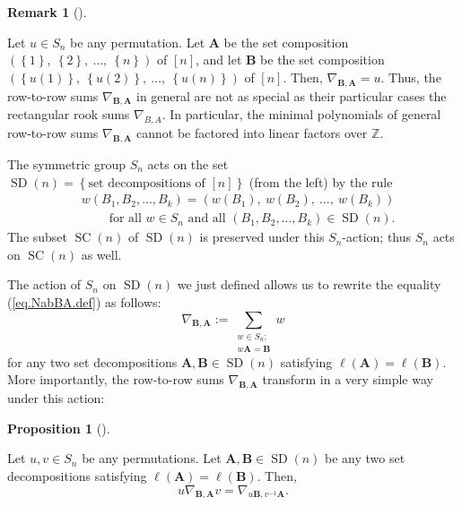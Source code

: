 \documentclass[numbers=enddot,12pt,final,onecolumn,notitlepage]{scrartcl}%
\numberwithin{exer}{subsection}
\theoremstyle{definition}
\newtheorem{prop}[theo]{Proposition}
\newenvironment{proposition}[1][]
{\begin{prop}[#1]\begin{leftbar}}
{\end{leftbar}\end{prop}}
\newtheorem{remk}[theo]{Remark}
\newenvironment{remark}[1][]
{\begin{remk}[#1]\begin{leftbar}}
{\end{leftbar}\end{remk}}
\let\sumnonlimits\sum
\renewcommand{\sum}{\sumnonlimits\limits}
\begin{document}
\begin{remark}
Let $u\in S_{n}$ be any permutation. Let $\mathbf{A}$ be the set composition
$\left(  \left\{  1\right\}  ,\ \left\{  2\right\}  ,\ \ldots,\ \left\{
n\right\}  \right)  $ of $\left[  n\right]  $, and let $\mathbf{B}$ be the set
composition $\left(  \left\{  u\left(  1\right)  \right\}  ,\ \left\{
u\left(  2\right)  \right\}  ,\ \ldots,\ \left\{  u\left(  n\right)  \right\}
\right)  $ of $\left[  n\right]  $. Then, $\nabla_{\mathbf{B},\mathbf{A}}=u$.
Thus, the row-to-row sums $\nabla_{\mathbf{B},\mathbf{A}}$ in general are not
as special as their particular cases the rectangular rook sums $\nabla_{B,A}$.
In particular, the minimal polynomials of general row-to-row sums
$\nabla_{\mathbf{B},\mathbf{A}}$ cannot be factored into linear factors over
$\mathbb{Z}$.
\end{remark}

The symmetric group $S_{n}$ acts on the set $\operatorname*{SD}\left(
n\right)  =\left\{  \text{set decompositions of }\left[  n\right]  \right\}  $
(from the left) by the rule%
\begin{align*}
&  w\left(  B_{1},B_{2},\ldots,B_{k}\right)  =\left(  w\left(  B_{1}\right)
,\ w\left(  B_{2}\right)  ,\ \ldots,\ w\left(  B_{k}\right)  \right) \\
&  \ \ \ \ \ \ \ \ \ \ \text{for all }w\in S_{n}\text{ and all }\left(
B_{1},B_{2},\ldots,B_{k}\right)  \in\operatorname*{SD}\left(  n\right)  .
\end{align*}
The subset $\operatorname*{SC}\left(  n\right)  $ of $\operatorname*{SD}%
\left(  n\right)  $ is preserved under this $S_{n}$-action; thus $S_{n}$ acts
on $\operatorname*{SC}\left(  n\right)  $ as well.

The action of $S_{n}$ on $\operatorname*{SD}\left(  n\right)  $ we just
defined allows us to rewrite the equality (\ref{eq.NabBA.def}) as follows:%
\begin{equation}
\nabla_{\mathbf{B},\mathbf{A}}:=\sum_{\substack{w\in S_{n};\\w\mathbf{A}%
=\mathbf{B}}}w \label{eq.NabBA.def.rewr}%
\end{equation}
for any two set decompositions $\mathbf{A},\mathbf{B}\in\operatorname*{SD}%
\left(  n\right)  $ satisfying $\ell\left(  \mathbf{A}\right)  =\ell\left(
\mathbf{B}\right)  $. More importantly, the row-to-row sums $\nabla
_{\mathbf{B},\mathbf{A}}$ transform in a very simple way under this action:

\begin{proposition}
\label{prop.uNabv}Let $u,v\in S_{n}$ be any permutations. Let $\mathbf{A}%
,\mathbf{B}\in\operatorname*{SD}\left(  n\right)  $ be any two set
decompositions satisfying $\ell\left(  \mathbf{A}\right)  =\ell\left(
\mathbf{B}\right)  $. Then,%
\begin{equation}
u\nabla_{\mathbf{B},\mathbf{A}}v=\nabla_{u\mathbf{B},v^{-1}\mathbf{A}}.
\label{eq.uNabv}%
\end{equation}

\end{proposition}
\end{document}
